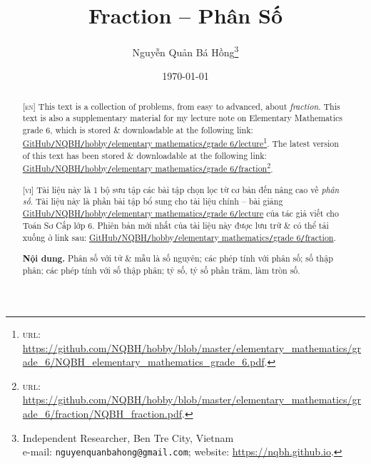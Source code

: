 \documentclass{article}
\title{Fraction -- Phân Số}
\author{Nguyễn Quản Bá Hồng\footnote{Independent Researcher, Ben Tre City, Vietnam\\e-mail: \texttt{nguyenquanbahong@gmail.com}; website: \url{https://nqbh.github.io}.}}
\date{\today}
\begin{document}
\maketitle
\begin{abstract}
	\textsc{[en]} This text is a collection of problems, from easy to advanced, about \textit{fraction}. This text is also a supplementary material for my lecture note on Elementary Mathematics grade 6, which is stored \& downloadable at the following link: \href{https://github.com/NQBH/hobby/blob/master/elementary_mathematics/grade_6/NQBH_elementary_mathematics_grade_6.pdf}{GitHub\texttt{/}NQBH\texttt{/}hobby\texttt{/}elementary mathematics\texttt{/}grade 6\texttt{/}lecture}\footnote{\textsc{url}: \url{https://github.com/NQBH/hobby/blob/master/elementary_mathematics/grade_6/NQBH_elementary_mathematics_grade_6.pdf}.}. The latest version of this text has been stored \& downloadable at the following link: \href{https://github.com/NQBH/hobby/blob/master/elementary_mathematics/grade_6/fraction/NQBH_fraction.pdf}{GitHub\texttt{/}NQBH\texttt{/}hobby\texttt{/}elementary mathematics\texttt{/}grade 6\texttt{/}fraction}\footnote{\textsc{url}: \url{https://github.com/NQBH/hobby/blob/master/elementary_mathematics/grade_6/fraction/NQBH_fraction.pdf}.}.
	\vspace{2mm}
	
	\textsc{[vi]} Tài liệu này là 1 bộ sưu tập các bài tập chọn lọc từ cơ bản đến nâng cao về \textit{phân số}. Tài liệu này là phần bài tập bổ sung cho tài liệu chính -- bài giảng \href{https://github.com/NQBH/hobby/blob/master/elementary_mathematics/grade_6/NQBH_elementary_mathematics_grade_6.pdf}{GitHub\texttt{/}NQBH\texttt{/}hobby\texttt{/}elementary mathematics\texttt{/}grade 6\texttt{/}lecture} của tác giả viết cho Toán Sơ Cấp lớp 6. Phiên bản mới nhất của tài liệu này được lưu trữ \& có thể tải xuống ở link sau: \href{https://github.com/NQBH/hobby/blob/master/elementary_mathematics/grade_6/fraction/NQBH_fraction.pdf}{GitHub\texttt{/}NQBH\texttt{/}hobby\texttt{/}elementary mathematics\texttt{/}grade 6\texttt{/}fraction}.
	
	\textsf{\textbf{Nội dung.} Phân số với tử \& mẫu là số nguyên; các phép tính với phân số; số thập phân; các phép tính với số thập phân; tỷ số, tỷ số phần trăm, làm tròn số.}
\end{abstract}
\tableofcontents
\newpage

\end{document}
